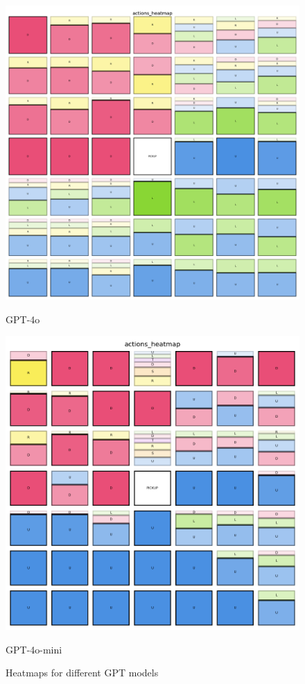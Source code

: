 \begin{figure}[ht]
\begin{minipage}[b]{0.32\textwidth}
    \includegraphics[width=\textwidth]{
      images/results_discussion/models/GPT4o/actions_heatmap.png
    }
    \caption{GPT-4o}
    \label{fig:models_gpt4o}
  \end{minipage}
  \hfill
  \begin{minipage}[b]{0.32\textwidth}
    \centering
    \includegraphics[width=\textwidth]{
      images/results_discussion/models/GPT4o-mini/actions_heatmap.png
    }
    \caption{GPT-4o-mini}
    \label{fig:models_gpt4o_mini}
  \end{minipage}
  \caption{Heatmaps for different GPT models}
  \label{fig:models_hm}
\end{figure}

